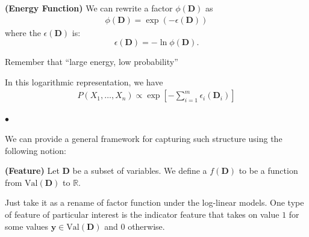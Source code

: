 \documentclass{article}
\newcommand{\bfs}[1]{\textbf{({#1}) }}
\begin{document}
\begin{defa}\bfs{Energy Function}
We can rewrite a factor $\phi(\boldsymbol{D})$ as
\begin{align*}
\phi(\boldsymbol{D})=\exp (-\epsilon(\boldsymbol{D}))
\end{align*}
where the  $\epsilon(\boldsymbol{D})$ is: $$\epsilon(\boldsymbol{D})=-\ln \phi(\boldsymbol{D}).$$
\end{defa}
 \begin{rema}
 Remember that ``large energy, low probability''
 \end{rema}
  In this logarithmic representation, we have
\begin{align*}
P\left(X_{1}, \ldots, X_{n}\right) \propto \exp \left[-\sum_{i=1}^{m} \epsilon_{i}\left(\boldsymbol{D}_{i}\right)\right]
\end{align*}

$\bullet$  

We can provide a general framework for capturing such structure using the following notion:
\begin{defa}\bfs{Feature}
Let $\boldsymbol{D}$ be a subset of variables. We define a  $f(\boldsymbol{D})$ to be a function from $\mathrm{Val}(\boldsymbol{D})$ to $\mathbb{R}$.
\end{defa}
\begin{rema}
Just take it as a rename of factor function under the log-linear models. One type of feature of particular interest is the indicator feature that takes on value $1$ for some values $\boldsymbol{y} \in \mathrm{Val}(\boldsymbol{D})$ and $0$ otherwise.
\end{rema}
\end{document}
